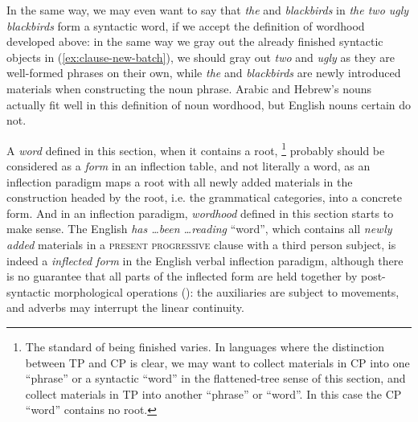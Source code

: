 \documentclass[a4paper, oneside, scheme=plain, 12pt]{article}
\newcommand*{\term}[1]{\emph{#1}}
\newcommand{\form}[1]{\emph{#1}}
\newcommand*{\category}[1]{\textsc{#1}}
\begin{document}
In the same way, we may even want to say that \form{the} and \form{blackbirds} 
in \form{the two ugly blackbirds} form a syntactic word,
if we accept the definition of wordhood developed above:
in the same way we gray out the already finished syntactic objects in (\ref{ex:clause-new-batch}),
we should gray out \form{two} and \form{ugly} as they are well-formed phrases on their own,
while \form{the} and \form{blackbirds} are newly introduced materials
when constructing the noun phrase.
Arabic and Hebrew's nouns actually fit well in this definition of noun wordhood,
but English nouns certain do not.

A \term{word} defined in this section, when it contains a root,%
\footnote{
    The standard of being finished varies.
    In languages where the distinction between TP and CP is clear,
    we may want to collect materials in CP into one ``phrase'' or a syntactic ``word'' in the flattened-tree sense of this section,
    and collect materials in TP into another ``phrase'' or ``word''.
    In this case the CP ``word'' contains no root.
}
probably should be considered as a \term{form} in an inflection table, and not literally a word,
as an inflection paradigm maps a root with all newly added materials in the construction headed by the root,
i.e. the grammatical categories, into a concrete form.
And in an inflection paradigm, \term{wordhood} defined in this section starts to make sense.
The English \form{has \dots been \dots reading} ``word'',
which contains all \emph{newly added} materials in a \category{present progressive} clause 
with a third person subject,
is indeed a \term{inflected form} in the English verbal inflection paradigm,
although there is no guarantee that all parts of the inflected form are held together
by post-syntactic morphological operations ():
the auxiliaries are subject to movements, and adverbs may interrupt the linear continuity.
\end{document}
